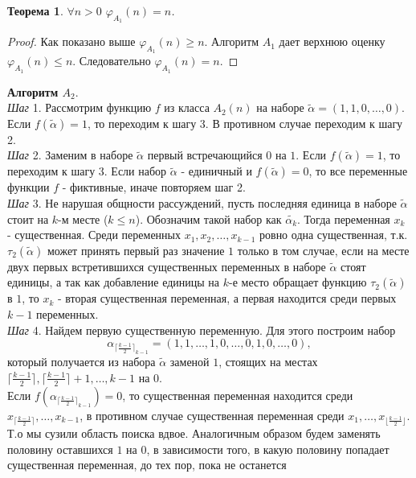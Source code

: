 \documentclass[oneside, final, 14pt]{extreport}
\newtheorem{thm}{Теорема}
\begin{document}
	\begin{thm} 
		$\forall n>0$  $\varphi_{A_1}(n) = n$.
	\end{thm}
	\begin{proof}
		Как показано выше $\varphi_{A_1}(n) \geq n$. Алгоритм $A_1$ дает верхнюю оценку $\varphi_{A_1}(n) \leq n$. Следовательно 
		$\varphi_{A_1}(n) = n$.
	\end{proof} \par
	\noindent\textbf{Алгоритм $A_2$}. \\
	\emph{Шаг} 1. Рассмотрим функцию $f$ из класса $A_2(n)$  на наборе $\tilde{\alpha} = (1, 1, 0, \ldots, 0)$. Если $f(\tilde{\alpha}) = 1$, то переходим к шагу 3. 
	В противном	случае переходим к шагу 2. \\
	\emph{Шаг} 2. Заменим в  наборе $\tilde{\alpha}$ первый встречающийся $0$ на  $1$. Если $f(\tilde{\alpha}) = 1$, то переходим к шагу 3. Если набор
	 $\tilde{\alpha}$ - единичный и $f(\tilde{\alpha}) = 0$, то все переменные функции $f$ - фиктивные, иначе повторяем шаг 2.\\
	\emph{Шаг} 3. Не нарушая общности рассуждений, пусть последняя единица в наборе $\tilde{\alpha}$ стоит на $k$-м месте ($k \leq n$).
	 Обозначим такой набор как $\tilde{\alpha_k}$. Тогда переменная  $x_k$ - существенная.
	 Среди переменных $x_1, x_2, \ldots, x_{k-1}$ ровно одна существенная, т.к. $\tau_2(\tilde{\alpha})$ может принять первый раз значение $1$ только в 
	 том случае, если на месте двух первых встретившихся существенных переменных в наборе $\tilde{\alpha}$ стоят единицы, 
	 а так как добавление единицы на $k$-е место обращает функцию $\tau_2(\tilde{\alpha})$ в $1$, то $x_k$ -  вторая существенная переменная, 
	 а первая находится среди первых $k-1$ переменных. \\
	\emph{Шаг} 4. Найдем первую существенную переменную. Для этого построим набор 
	$${\alpha_{\lceil \frac{k-1}{2}\rceil_{k-1}}} = (1, 1, \ldots, 1, 0, \ldots, 0, 1, 0, \ldots, 0),$$
	 который получается из набора $\tilde{\alpha}$ заменой $1$, стоящих на местах $\lceil \frac{k-1}{2} \rceil, \lceil \frac{k-1}{2} \rceil + 1, \ldots, k-1$ на $0$. \\
	 Если $f({\alpha_{\lceil\frac{k-1}{2}\rceil_{k-1}}}) = 0$, то существенная переменная находится среди $x_{\lceil\frac{k-1}{2}\rceil}, \ldots, x_{k-1}$, в противном
	 случае существенная переменная среди $x_1, \ldots, x_{\lfloor \frac{k-1}{2} \rfloor}$. Т.о мы сузили область поиска вдвое. Аналогичным образом 
	 будем заменять половину оставшихся $1$ на $0$, в зависимости  того, в какую половину попадает существенная переменная, до тех пор, пока не останется 
\end{document}
